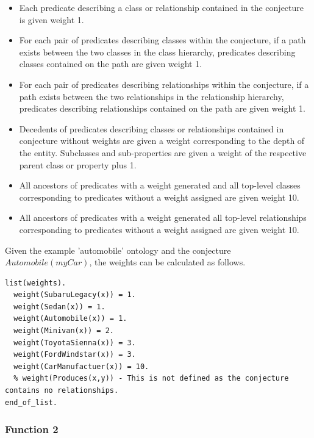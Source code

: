 \documentclass{article}
\begin{document}
\begin{singlespace}
\begin{itemize}
	\item Each predicate describing a class or relationship contained in the conjecture is given weight 1. 
	\item For each pair of predicates describing classes within the conjecture, if a path exists between the two classes in the class hierarchy, predicates describing classes contained on the path are given weight 1. 
	\item For each pair of predicates describing relationships within the conjecture, if a path exists between the two relationships in the relationship hierarchy, predicates describing relationships contained on the path are given weight 1. 
	\item Decedents of predicates describing classes or relationships contained in conjecture without weights are given a weight corresponding to the depth of the entity. Subclasses and sub-properties are given a weight of the respective parent class or property plus 1. 
	\item All ancestors of predicates with a weight generated and all top-level classes corresponding to predicates without a weight assigned are given weight 10.
	\item All ancestors of predicates with a weight generated all top-level relationships corresponding to predicates without a weight assigned are given weight 10.
\end{itemize}
\end{singlespace}

Given the example 'automobile' ontology and the conjecture $Automobile(myCar)$, the weights can be calculated as follows. 

\begin{singlespace}
\begin{verbatim}
list(weights).
  weight(SubaruLegacy(x)) = 1. 
  weight(Sedan(x)) = 1. 
  weight(Automobile(x)) = 1. 
  weight(Minivan(x)) = 2. 
  weight(ToyotaSienna(x)) = 3. 
  weight(FordWindstar(x)) = 3. 
  weight(CarManufactuer(x)) = 10. 
  % weight(Produces(x,y)) - This is not defined as the conjecture contains no relationships. 
end_of_list.
\end{verbatim}
\end{singlespace}

\subsubsection{Function 2}
\end{document}
